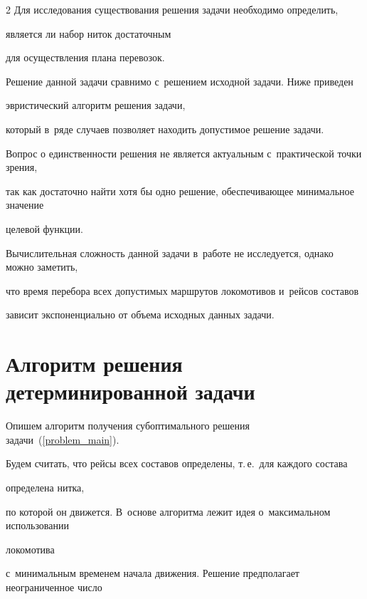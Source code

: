 \begin{multicols}{2}
Для исследования существования решения задачи необходимо определить, 


является ли набор ниток достаточным


для осуществления плана перевозок.


Решение данной задачи сравнимо с~решением исходной задачи. Ниже приведен 


эвристический алгоритм решения задачи,


который в~ряде случаев позволяет находить допустимое решение задачи.


Вопрос о единственности решения не является актуальным с~практической точки зрения,


так как достаточно найти хотя бы одно решение, обеспечивающее минимальное значение 


целевой функции.


Вычислительная сложность данной задачи в~работе не исследуется, однако можно заметить,


что время перебора всех допустимых маршрутов локомотивов и~рейсов составов


зависит экспоненциально от объема исходных данных задачи.





\vspace*{-2pt}





\section{Алгоритм решения детерминированной задачи}





\vspace*{-2pt}





Опишем алгоритм получения субоптимального решения задачи~(\ref{problem_main}).


Будем считать, что рейсы всех составов определены, т.\,е.\ для каждого состава 


определена нитка,


по которой он движется. В~основе алгоритма лежит идея о~максимальном использовании 


локомотива


с~минимальным временем начала движения. Решение предполагает неограниченное число 



\end{multicols}
